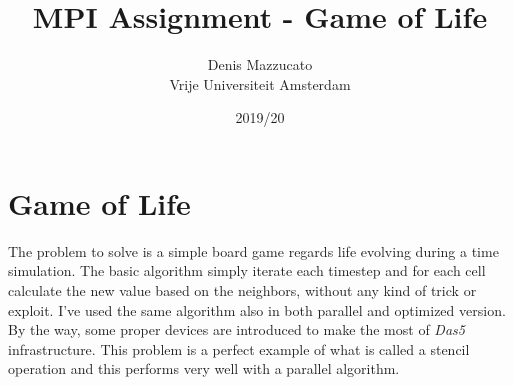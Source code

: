 \documentclass{article}
\begin{document}
\title{MPI Assignment - Game of Life}
\author{Denis Mazzucato\\Vrije Universiteit Amsterdam}
\date{2019/20}

\maketitle
\vfill
\tableofcontents
\newpage




\section{Game of Life}

The problem to solve is a simple board game regards life evolving during a time
simulation.
The basic algorithm simply iterate each timestep and for each cell calculate
the new value based on the neighbors,
without any kind of trick or exploit.
I've used the same algorithm also in both parallel and optimized version.
By the way, some proper devices are introduced to make the most of
\textit{Das5} infrastructure.
This problem is a perfect example of what is called a stencil operation and
this performs very well with a parallel algorithm.
\end{document}
